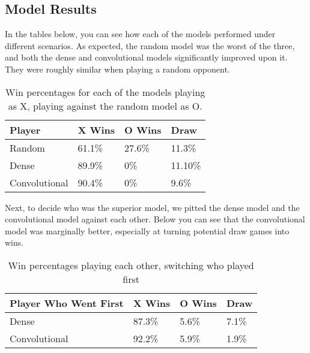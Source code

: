 \subsection{Model Results}

In the tables below, you can see how each of the models performed under different scenarios. As expected, the random model was the worst of the three, and both the dense and convolutional models significantly improved upon it. They were roughly similar when playing a random opponent.

	\begin{table}[H]
	\centering
	\begin{tabular}{llll}
		\hline
		\textbf{Player} & \textbf{X Wins} & \textbf{O Wins} & \textbf{Draw} \\ \hline
		Random          & 61.1\%          & 27.6\%          & 11.3\%        \\
		Dense           & 89.9\%          & 0\%           & 11.10\%        \\
		Convolutional   & 90.4\%            & 0\%           & 9.6\%         \\ \hline
	\end{tabular}
	\caption{Win percentages for each of the models playing as X, playing against the random model as O.}
\end{table}

Next, to decide who was the superior model, we pitted the dense model and the convolutional model against each other. Below you can see that the convolutional model was marginally better, especially at turning potential draw games into wins. 

\begin{table}[H]
	\centering
	\begin{tabular}{llll}
		\hline
		\textbf{Player Who Went First} & \textbf{X Wins} & \textbf{O Wins} & \textbf{Draw} \\ \hline
		Dense           & 87.3\%          & 5.6\%           & 7.1\%        \\
		Convolutional   & 92.2\%            & 5.9\%           & 1.9\%         \\ \hline
	\end{tabular}
	\caption{Win percentages playing each other, switching who played first}
\end{table}
